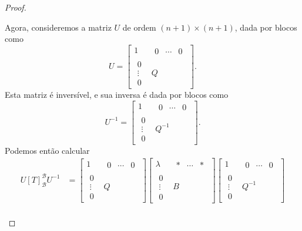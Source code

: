 \begin{proof}
\begin{itemize}
	Agora, consideremos a matriz $U$ de ordem $(n+1)\times(n+1)$, dada por blocos como
	\[U=\begin{bmatrix}1&\begin{matrix}0&\cdots&0\end{matrix}\\	\begin{matrix}0\\\vdots\\0\end{matrix}&Q\end{bmatrix}.\]
	Esta matriz é inversível, e sua inversa é dada por blocos como
	\[U^{-1}=\begin{bmatrix}1&\begin{matrix}0&\cdots&0\end{matrix}\\	\begin{matrix}0\\\vdots\\0\end{matrix}&Q^{-1}\end{bmatrix}.\]
	Podemos então calcular
	\begin{align*}
		U[T]_{\mathcal{B}}^{\mathcal{B}}U^{-1}
			&=\begin{bmatrix}1&\begin{matrix}0&\cdots&0\end{matrix}\\\begin{matrix}0\\\vdots\\0\end{matrix}&Q\end{bmatrix}\begin{bmatrix}\lambda&\begin{matrix}\ast&\cdots&\ast\end{matrix}\\\begin{matrix}0\\\vdots\\0\end{matrix}&B\end{bmatrix}\begin{bmatrix}1&\begin{matrix}0&\cdots&0\end{matrix}\\	\begin{matrix}0\\\vdots\\0\end{matrix}&Q^{-1}\end{bmatrix}\\

\end{align*}
\end{itemize}
\end{proof}
